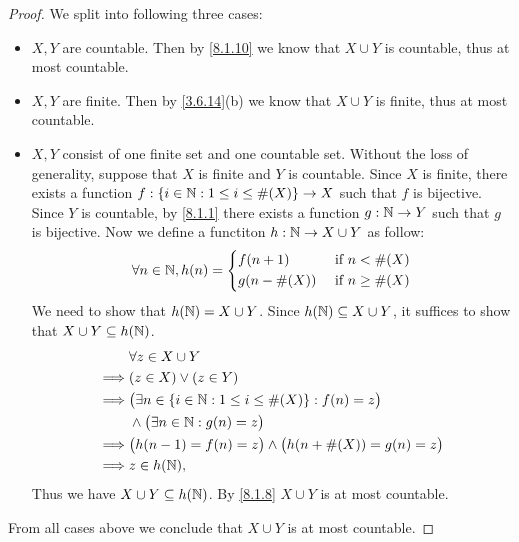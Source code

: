 \begin{proof}
	We split into following three cases:
	\begin{itemize}
		\item \(X, Y\) are countable.
		      Then by \cref{8.1.10} we know that \(X \cup Y\) is countable, thus at most countable.
		\item \(X, Y\) are finite.
		      Then by \cref{3.6.14}(b) we know that \(X \cup Y\) is finite, thus at most countable.
		\item \(X, Y\) consist of one finite set and one countable set.
		      Without the loss of generality, suppose that \(X\) is finite and \(Y\) is countable.
		      Since \(X\) is finite, there exists a function \(f : \left\lbrace i \in \mathbb{N} : 1 \leq i \leq \#(X)\right\rbrace \to X\) such that \(f\) is bijective.
		      Since \(Y\) is countable, by \cref{8.1.1} there exists a function \(g : \mathbb{N} \to Y\) such that \(g\) is bijective.
		      Now we define a functiton \(h : \mathbb{N} \to X \cup Y\) as follow:
		      \[
			      \forall n \in \mathbb{N}, h(n) = \begin{dcases}
				      f(n + 1)     & \text{ if } n < \#(X)    \\
				      g(n - \#(X)) & \text{ if } n \geq \#(X)
			      \end{dcases}
		      \]
		      We need to show that \(h(\mathbb{N}) = X \cup Y\).
		      Since \(h(\mathbb{N}) \subseteq X \cup Y\), it suffices to show that \(X \cup Y \subseteq h(\mathbb{N})\).
		      \begin{align*}
			               & \forall z \in X \cup Y                                                  \\
			      \implies & (z \in X) \lor (z \in Y)                                                \\
			      \implies & \big(\exists n \in \left\lbrace i \in \mathbb{N} : 1 \leq i \leq \#(X)\right\rbrace : f(n) = z\big) \\
			               & \land \big(\exists n \in \mathbb{N} : g(n) = z\big)                             \\
			      \implies & \big(h(n - 1) = f(n) = z\big) \land \big(h(n + \#(X)) = g(n) = z\big)   \\
			      \implies & z \in h(\mathbb{N}),
		      \end{align*}
		      Thus we have \(X \cup Y \subseteq h(\mathbb{N})\).
		      By \cref{8.1.8} \(X \cup Y\) is at most countable.
	\end{itemize}
	From all cases above we conclude that \(X \cup Y\) is at most countable.
\end{proof}

